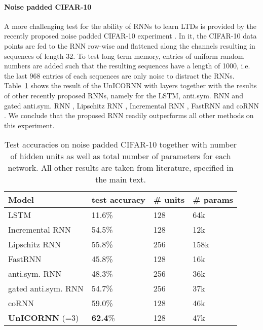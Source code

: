 \documentclass[a4paper]{article}
\newcommand{\Tref}[1]{Table~\ref{#1}}
\begin{document}
\paragraph{Noise padded CIFAR-10} 
A more challenging test for the ability of RNNs to learn LTDs is provided by the recently proposed noise padded CIFAR-10 experiment \citep{anti}. In it, the CIFAR-10 data points \citep{cifar} are fed to the RNN row-wise and flattened along the channels resulting in sequences of length 32. To test long term memory, entries of uniform random numbers are added such that the resulting sequences have a length of 1000, i.e. the last 968 entries of each sequences are only noise to distract the RNNs. \Tref{tab:cifar} shows the result of the UnICORNN with  layers together with the results of other recently proposed RNNs, namely for the LSTM, anti.sym. RNN and gated anti.sym. RNN \citep{anti}, Lipschitz RNN \citep{lip_rnn}, Incremental RNN \citep{inc_rnn}, FastRNN \citep{fastrnn} and coRNN \cite{coRNN}. We conclude that the proposed RNN readily outperforms all other methods on this experiment.
\begin{table}[h!]
  \caption{Test accuracies on noise padded CIFAR-10 together with number of hidden units as well as total number of parameters for each network. All other results are taken from literature, specified in the main text.}
  \label{tab:cifar}
  \centering
  \begin{tabular}{llll}
    \toprule
    \cmidrule(r){1-4}
    { Model} &  test accuracy & \# units & { \# params} \\
    \midrule
LSTM & 11.6\% & 128 & 64k\\
Incremental RNN& 54.5\% & 128 & 12k\\
Lipschitz RNN & 55.8\%  & 256 & 158k\\
FastRNN & 45.8\% & 128 & 16k\\
anti.sym. RNN & 48.3\% & 256 & 36k\\
gated anti.sym. RNN & 54.7\% & 256 & 37k \\
coRNN & 59.0\% & 128 & 46k \\
\textbf{UnICORNN} (=3) & \textbf{62.4}\% & 128 & 47k\\
    \bottomrule
  \end{tabular}
\end{table}
\end{document}
